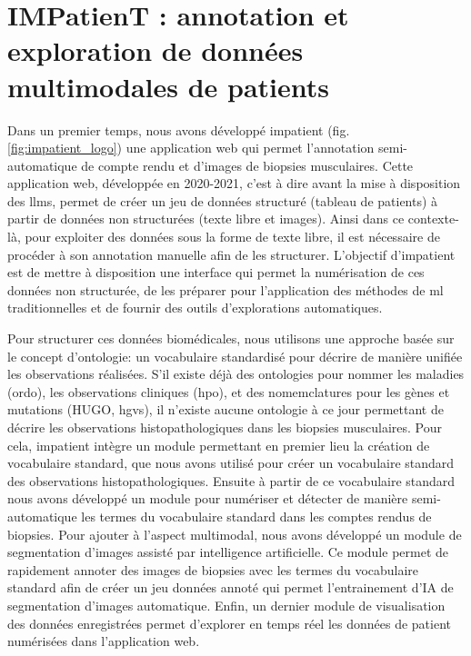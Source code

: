 \chapter{IMPatienT : annotation et exploration de données multimodales de patients}\label{chap_imp}

Dans un premier temps, nous avons développé \gls{impatient} (fig. \ref{fig:impatient_logo}) une application web qui permet l'annotation semi-automatique de compte rendu et d'images de biopsies musculaires. Cette application web, développée en 2020-2021, c'est à dire avant la mise à disposition des \gls{llms}, permet de créer un jeu de données structuré (tableau de patients) à partir de données non structurées (texte libre et images). Ainsi dans ce contexte-là, pour exploiter des données sous la forme de texte libre, il est nécessaire de procéder à son annotation manuelle afin de les structurer. L'objectif d'\gls{impatient} est de mettre à disposition une interface qui permet la numérisation de ces données non structurée, de les préparer pour l'application des méthodes de \gls{ml} traditionnelles et de fournir des outils d'explorations automatiques.


Pour structurer ces données biomédicales, nous utilisons une approche basée sur le concept d'ontologie: un vocabulaire standardisé pour décrire de manière unifiée les observations réalisées. S'il existe déjà des ontologies pour nommer les maladies (\gls{ordo}), les observations cliniques (\gls{hpo}), et des nomemclatures pour les gènes et mutations (HUGO, \gls{hgvs}), il n'existe aucune ontologie à ce jour permettant de décrire les observations histopathologiques dans les biopsies musculaires. Pour cela, \gls{impatient} intègre un module permettant en premier lieu la création de vocabulaire standard, que nous avons utilisé pour créer un vocabulaire standard des observations histopathologiques. Ensuite à partir de ce vocabulaire standard nous avons développé un module pour numériser et détecter de manière semi-automatique les termes du vocabulaire standard dans les comptes rendus de biopsies. Pour ajouter à l'aspect multimodal, nous avons développé un module de segmentation d'images assisté par intelligence artificielle. Ce module permet de rapidement annoter des images de biopsies avec les termes du vocabulaire standard afin de créer un jeu données annoté qui permet l'entrainement d'IA de segmentation d'images automatique. Enfin, un dernier module de visualisation des données enregistrées permet d'explorer en temps réel les données de patient numérisées dans l'application web.

